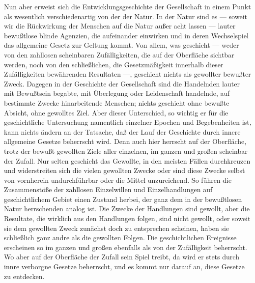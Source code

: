 Nun aber erweist sich die Entwicklungsgeschichte der
Gesellschaft in einem Punkt als wesentlich verschiedenartig von der der
Natur. In der Natur sind es --- soweit wir die Rückwirkung der Menschen
auf die Natur außer acht lassen --- lauter bewußtlose blinde Agenzien, die
aufeinander einwirken und in deren Wechselspiel das allgemeine Gesetz
zur Geltung kommt. Von allem, was geschieht --- weder von den zahllosen
scheinbaren Zufälligkeiten, die auf der Oberfläche sichtbar werden, noch
von den schließlichen, die Gesetzmäßigkeit innerhalb dieser
Zufälligkeiten bewährenden Resultaten ---, geschieht nichts als gewollter
bewußter Zweck. Dagegen in der Geschichte der Gesellschaft sind die
Handelnden lauter mit Bewußtsein begabte, mit Überlegung oder
Leidenschaft handelnde, auf bestimmte Zwecke hinarbeitende Menschen;
nichts geschieht ohne bewußte Absicht, ohne gewolltes Ziel. Aber dieser
Unterschied, so wichtig er für die geschichtliche Untersuchung
namentlich einzelner Epochen und Begebenheiten ist, kann nichts ändern
an der Tatsache, daß der Lauf der Geschichte durch innere allgemeine
Gesetze beherrscht wird. Denn auch hier herrscht auf der Oberfläche,
trotz der bewußt gewollten Ziele aller einzelnen, im ganzen und großen
scheinbar der Zufall. Nur selten geschieht das Gewollte, in
den \textbar{}meisten Fällen
durchkreuzen und widerstreiten sich die vielen gewollten Zwecke oder
sind diese Zwecke selbst von vornherein undurchführbar oder die Mittel
unzureichend. So führen die Zusammenstöße der zahllosen Einzelwillen und
Einzelhandlungen auf geschichtlichem Gebiet einen Zustand herbei, der
ganz dem in der bewußtlosen Natur herrschenden analog ist. Die Zwecke
der Handlungen sind gewollt, aber die Resultate, die wirklich aus den
Handlungen folgen, sind nicht gewollt, oder soweit sie dem gewollten
Zweck zunächst doch zu entsprechen scheinen, haben sie schließlich ganz
andre als die gewollten Folgen. Die geschichtlichen Ereignisse
erscheinen so im ganzen und großen ebenfalls als von der Zufälligkeit
beherrscht. Wo aber auf der Oberfläche der Zufall sein Spiel treibt, da
wird er stets durch innre verborgne Gesetze beherrscht, und es kommt nur
darauf an, diese Gesetze zu entdecken.\est\


